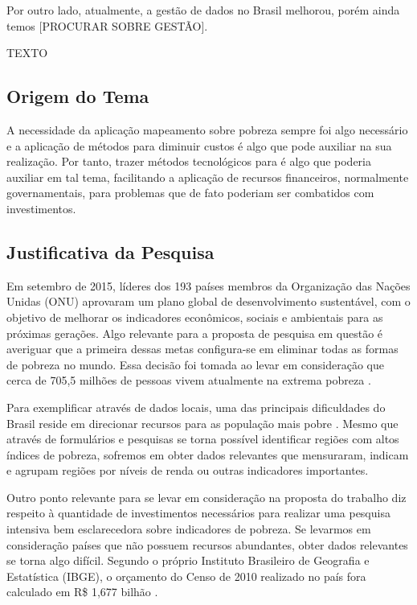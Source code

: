\documentclass[]{article}
\begin{document}
Por outro lado, atualmente, a gestão de dados no Brasil melhorou, porém ainda temos [PROCURAR SOBRE GESTÃO]. 

TEXTO

\subsection{Origem do Tema}
A necessidade da aplicação mapeamento sobre pobreza sempre foi algo necessário e a aplicação de métodos para diminuir custos é algo que pode auxiliar na sua realização. Por tanto, trazer métodos tecnológicos para é algo que poderia auxiliar em tal tema, facilitando a aplicação de recursos financeiros, normalmente governamentais, para problemas que de fato poderiam ser combatidos com investimentos.

\subsection{Justificativa da Pesquisa}
Em setembro de 2015, líderes dos 193 países membros da Organização das Nações Unidas (ONU) aprovaram um plano global de desenvolvimento sustentável, com o objetivo de melhorar os indicadores econômicos, sociais e ambientais para as próximas gerações\cite{ref_nacoes}. Algo relevante para a proposta de pesquisa em questão é averiguar que a primeira dessas metas configura-se em eliminar todas as formas de pobreza no mundo. Essa decisão foi tomada ao levar em consideração que cerca de 705,5 milhões de pessoas vivem atualmente na extrema pobreza \cite{ref_extrema_pobreza}. 

Para exemplificar através de dados locais, uma das principais dificuldades do Brasil reside em direcionar recursos para as população mais pobre \cite{ref_lazarotto}. Mesmo que através de formulários e pesquisas se torna possível identificar regiões com altos índices de pobreza, sofremos em obter dados relevantes que mensuraram, indicam e agrupam regiões por níveis de renda ou outras indicadores importantes.

Outro ponto relevante para se levar em consideração na proposta do trabalho diz respeito à quantidade de investimentos necessários para realizar uma pesquisa intensiva bem esclarecedora sobre indicadores de pobreza. Se levarmos em consideração países que não possuem recursos abundantes, obter dados relevantes se torna algo difícil. Segundo o próprio Instituto Brasileiro de Geografia e Estatística (IBGE), o orçamento do Censo de 2010 realizado no país fora calculado em R\$ 1,677 bilhão \cite{ref_IBGE}.
\end{document}
